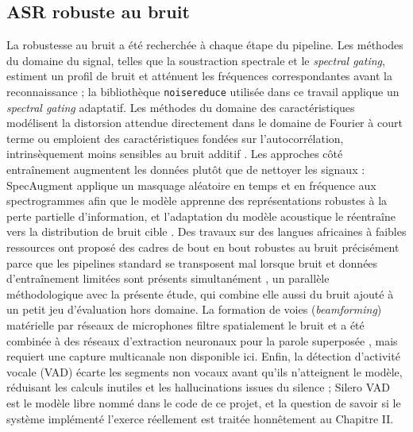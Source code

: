 \documentclass[12pt]{report}
\begin{document}
\subsection{ASR robuste au bruit}
La robustesse au bruit a été recherchée à chaque étape du pipeline. Les méthodes du domaine du signal, telles que la soustraction spectrale et le \textit{spectral gating}, estiment un profil de bruit et atténuent les fréquences correspondantes avant la reconnaissance ; la bibliothèque \texttt{noisereduce} utilisée dans ce travail applique un \textit{spectral gating} adaptatif. Les méthodes du domaine des caractéristiques modélisent la distorsion attendue directement dans le domaine de Fourier à court terme \cite{astudillo2013computing} ou emploient des caractéristiques fondées sur l'autocorrélation, intrinsèquement moins sensibles au bruit additif \cite{farahani2017autocorrelation}. Les approches côté entraînement augmentent les données plutôt que de nettoyer les signaux : SpecAugment \cite{park2019specaugment} applique un masquage aléatoire en temps et en fréquence aux spectrogrammes afin que le modèle apprenne des représentations robustes à la perte partielle d'information, et l'adaptation du modèle acoustique le réentraîne vers la distribution de bruit cible \cite{li2014overview,bhardwaj2021usage}. Des travaux sur des langues africaines à faibles ressources ont proposé des cadres de bout en bout robustes au bruit précisément parce que les pipelines standard se transposent mal lorsque bruit et données d'entraînement limitées sont présents simultanément \cite{ejigu2025noise}, un parallèle méthodologique avec la présente étude, qui combine elle aussi du bruit ajouté à un petit jeu d'évaluation hors domaine. La formation de voies (\textit{beamforming}) matérielle par réseaux de microphones filtre spatialement le bruit et a été combinée à des réseaux d'extraction neuronaux pour la parole superposée \cite{chen2018multi}, mais requiert une capture multicanale non disponible ici. Enfin, la détection d'activité vocale (VAD) écarte les segments non vocaux avant qu'ils n'atteignent le modèle, réduisant les calculs inutiles et les hallucinations issues du silence ; Silero VAD est le modèle libre nommé dans le code de ce projet, et la question de savoir si le système implémenté l'exerce réellement est traitée honnêtement au Chapitre II.
\end{document}
